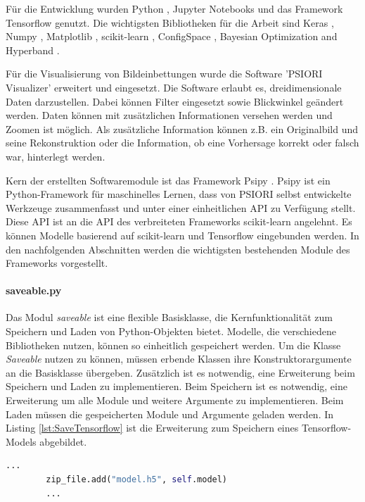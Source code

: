 	Für die Entwicklung wurden Python \cite{PythonSoftwareFoundation.2020}, Jupyter Notebooks \cite{ProjectJupyter.} und das Framework Tensorflow \cite{MartinAbadi.2015}  genutzt. Die wichtigsten Bibliotheken für die Arbeit sind Keras \cite{Chollet.2015} , Numpy \cite{Oliphant.2006} , Matplotlib \cite{Hunter.2007} , scikit-learn \cite{Pedregosa.2011} , ConfigSpace \cite{Lindauer.2019} , Bayesian Optimization and Hyperband \cite{StefanFalkner.2018}. 
	
	Für die Visualisierung von Bildeinbettungen wurde die Software 'PSIORI Visualizer' erweitert und eingesetzt. Die Software erlaubt es, dreidimensionale Daten darzustellen. Dabei können Filter eingesetzt sowie Blickwinkel geändert werden. Daten können mit zusätzlichen Informationen versehen werden und Zoomen ist möglich. Als zusätzliche Information können z.B. ein Originalbild und seine Rekonstruktion oder die Information, ob eine Vorhersage korrekt oder falsch war, hinterlegt werden.
	
	Kern der erstellten Softwaremodule ist das Framework Psipy \cite{PSIORIGmbH.2019}. Psipy ist ein Python-Framework für maschinelles Lernen, dass von PSIORI selbst entwickelte Werkzeuge zusammenfasst und unter einer einheitlichen API zu Verfügung stellt. Diese API ist an die API des verbreiteten Frameworks scikit-learn angelehnt. Es können Modelle basierend auf scikit-learn  und Tensorflow eingebunden werden. In den nachfolgenden Abschnitten werden die wichtigsten bestehenden Module des Frameworks vorgestellt.
	
	 \paragraph{saveable.py} Das Modul \textit{saveable} ist eine flexible Basisklasse, die Kernfunktionalität zum Speichern und Laden von Python-Objekten bietet. Modelle, die verschiedene Bibliotheken nutzen, können so einheitlich gespeichert werden. Um die Klasse \textit{Saveable} nutzen zu können, müssen erbende Klassen ihre Konstruktorargumente an die Basisklasse übergeben. Zusätzlich ist es notwendig, eine Erweiterung beim Speichern und Laden zu implementieren. Beim Speichern ist es notwendig, eine Erweiterung um alle Module und weitere Argumente zu implementieren. Beim Laden müssen die gespeicherten Module und Argumente geladen werden. In Listing \ref{lst:SaveTensorflow} ist die Erweiterung zum Speichern eines Tensorflow-Models abgebildet. 
	\begin{lstlisting}[language=python,caption=Erweiterung zum Speichern eines Tensorflow Models, label=lst:SaveTensorflow]
		...
		zip_file.add("model.h5", self.model)
		...
	\end{lstlisting}

